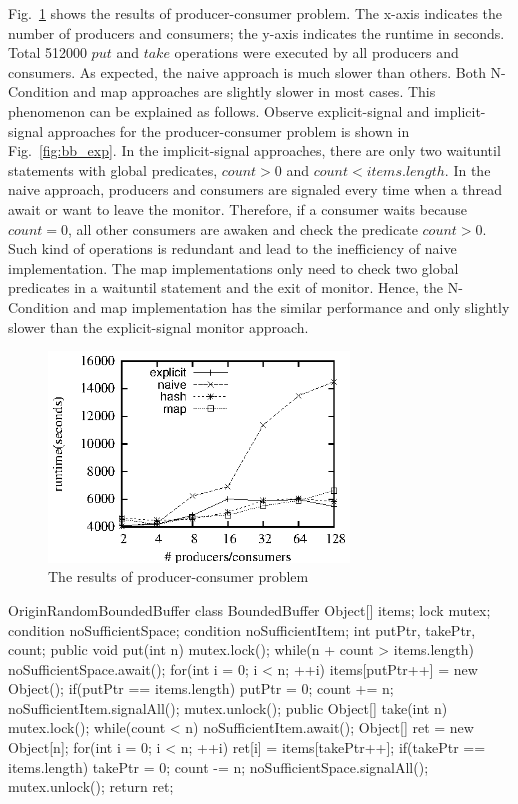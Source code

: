 \documentclass[10pt, conference, compsocconf]{IEEEtran}
\begin{document}
Fig.~\ref{fig:pc_eval} shows the results of producer-consumer problem. The
x-axis indicates the number of producers and consumers; the y-axis indicates the
runtime in seconds. Total 512000 $put$ and $take$ operations were executed by
all producers and consumers. As expected, the naive approach is much slower than
others. Both N-Condition and map approaches are slightly slower in most cases.
This phenomenon can be explained as follows. Observe explicit-signal and 
implicit-signal approaches for the producer-consumer problem is shown in 
Fig.~\ref{fig:bb_exp}. In the implicit-signal approaches, there are only two 
waituntil statements with global predicates, $count > 0$ and 
$count < items.length$. In the naive approach, producers and consumers are
signaled every time when a thread await or want to leave the monitor. Therefore,
if a consumer waits because $count = 0$, all other consumers are awaken and
check the predicate $count > 0$. Such kind of operations is redundant and lead
to the inefficiency of naive implementation. The map
implementations only need to check two global predicates in a waituntil
statement and the exit of monitor. Hence, the N-Condition and map implementation 
has the similar performance and only slightly slower than the explicit-signal
monitor approach. 
\begin{figure}[ht!]
  \centering
  \includegraphics[width=80mm]{fig/pc.eps}
  \caption{The results of producer-consumer problem}
  \label{fig:pc_eval}
\end{figure}

\begin{SaveVerbatim}{OriginRandomBoundedBuffer}
class BoundedBuffer {
  Object[] items;  
  lock mutex;
  condition noSufficientSpace;
  condition noSufficientItem;
  int putPtr, takePtr, count;
  public void put(int n) {
    mutex.lock();
    while(n + count > items.length) {
      noSufficientSpace.await();
    }
    for(int i = 0; i < n; ++i) {
      items[putPtr++] = new Object();
      if(putPtr == items.length) {
        putPtr = 0;
      }
    }
    count += n;
    noSufficientItem.signalAll();
    mutex.unlock();
  }
  public Object[] take(int n) {
    mutex.lock();
    while(count < n) {
      noSufficientItem.await();
    }
    Object[] ret = new Object[n];
    for(int i = 0; i < n; ++i) {
      ret[i] = items[takePtr++];
      if(takePtr == items.length) {
        takePtr = 0;
      }
    }
    count -= n;
    noSufficientSpace.signalAll();
    mutex.unlock();
    return ret;
  }
}
\end{SaveVerbatim}
\end{document}
